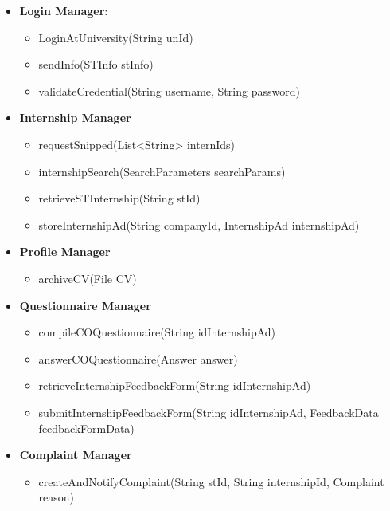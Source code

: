 \begin{itemize}
      \item \textbf{Login Manager}:
          \begin{itemize}
              \item LoginAtUniversity(String unId)
              \item sendInfo(STInfo stInfo)
              \item validateCredential(String username, String password)
          \end{itemize}
  
      \item \textbf{Internship Manager}
          \begin{itemize}
              \item requestSnipped(List<String> internIds)
              \item internshipSearch(SearchParameters searchParams)
              \item retrieveSTInternship(String stId)
              \item storeInternshipAd(String companyId, InternshipAd internshipAd)
          \end{itemize}
  
      \item \textbf{Profile Manager}
          \begin{itemize}
              \item archiveCV(File CV)
          \end{itemize}
      
      \item \textbf{Questionnaire Manager}
          \begin{itemize}
              \item compileCOQuestionnaire(String idInternshipAd)
              \item answerCOQuestionnaire(Answer answer)
              \item retrieveInternshipFeedbackForm(String idInternshipAd)
              \item submitInternshipFeedbackForm(String idInternshipAd, FeedbackData feedbackFormData)
          \end{itemize}
  
      \item \textbf{Complaint Manager}
          \begin{itemize}
              \item createAndNotifyComplaint(String stId, String internshipId, Complaint reason)
          \end{itemize}
  

\end{itemize}
